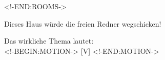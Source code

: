 \documentclass[ngerman,12pt]{beamer}
\begin{document}
<!-END:ROOMS->

\begin{frame}
  \vfill
  \begin{center}
    \huge
  Dieses Haus würde die freien Redner wegschicken!
  \end{center}
  \vfill
\end{frame}

\begin{frame}
  \vfill
  \begin{center}
    \huge
  Das wirkliche Thema lautet:\\ \pause
  <!-BEGIN:MOTION-> [V] <!-END:MOTION->
  \end{center}
  \vfill
\end{frame}
\end{document}
